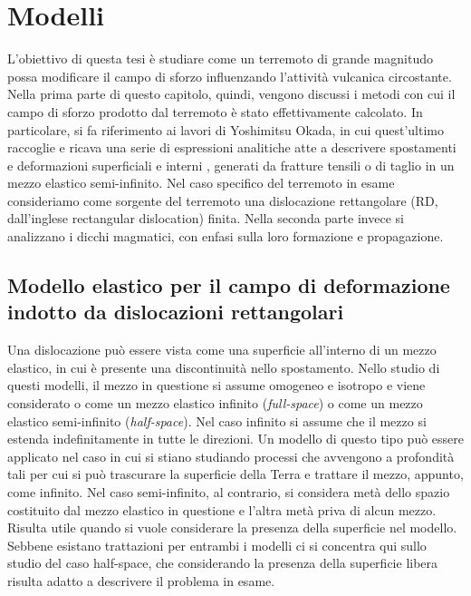 \chapter{Modelli}

L'obiettivo di questa tesi è studiare come un terremoto di grande magnitudo possa modificare il campo di sforzo influenzando l'attività vulcanica circostante. Nella prima parte di questo capitolo, quindi, vengono discussi i metodi con cui il campo di sforzo prodotto dal terremoto è stato effettivamente calcolato. In particolare, si fa riferimento ai lavori di Yoshimitsu Okada, in cui quest'ultimo raccoglie e ricava una serie di espressioni analitiche atte a descrivere spostamenti e deformazioni superficiali \citep{okada1985surface} e interni \citep{okada1992internal}, generati da fratture tensili o di taglio in un mezzo elastico semi-infinito. Nel caso specifico del terremoto in esame consideriamo come sorgente del terremoto una dislocazione rettangolare (RD, dall'inglese rectangular dislocation) finita. Nella seconda parte invece si analizzano i dicchi magmatici, con enfasi sulla loro formazione e propagazione.

\section{Modello elastico per il campo di deformazione indotto da dislocazioni rettangolari}

Una dislocazione può essere vista come una superficie all'interno di un mezzo elastico, in cui è presente una discontinuità nello spostamento. Nello studio di questi modelli, il mezzo in questione si assume omogeneo e isotropo e viene considerato o come un mezzo elastico infinito (\textit{full-space}) o come un mezzo elastico semi-infinito (\textit{half-space}). Nel caso infinito si assume che il mezzo si estenda indefinitamente in tutte le direzioni. Un modello di questo tipo può essere applicato nel caso in cui si stiano studiando processi che avvengono a profondità tali per cui si può trascurare la superficie della Terra e trattare il mezzo, appunto, come infinito. Nel caso semi-infinito, al contrario, si considera metà dello spazio costituito dal mezzo elastico in questione e l'altra metà priva di alcun mezzo. Risulta utile quando si vuole considerare la presenza della superficie nel modello. Sebbene esistano trattazioni per entrambi i modelli ci si concentra qui sullo studio del caso half-space, che considerando la presenza della superficie libera risulta adatto a descrivere il problema in esame.

